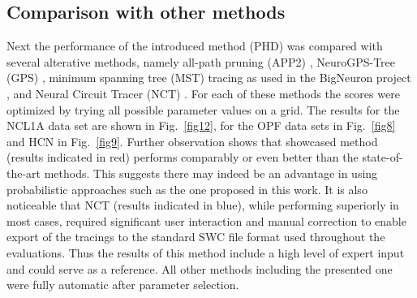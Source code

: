 \subsection{Comparison with other methods}
\label{subsec:comparison-with-other-methods}
Next the performance of the introduced method (PHD) was compared with several alterative methods, namely all-path pruning (APP2) \cite{xiao2013app2}, NeuroGPS-Tree (GPS) \cite{quan2016neurogps}, minimum spanning tree (MST) tracing as used in the BigNeuron project \cite{peng2015bigneuron}, and Neural Circuit Tracer (NCT) \cite{chothani2011automated}. For each of these methods the scores were optimized by trying all possible parameter values on a grid. The results for the NCL1A data set are shown in Fig.~\ref{fig12}, for the OPF data sets in Fig.~\ref{fig8} and HCN in Fig.~\ref{fig9}. Further observation shows that showcased method (results indicated in red) performs comparably or even better than the state-of-the-art methods. This suggests there may indeed be an advantage in using probabilistic approaches such as the one proposed in this work. It is also noticeable that NCT (results indicated in blue), while performing superiorly in most cases, required significant user interaction and manual correction to enable export of the tracings to the standard SWC file format used throughout the evaluations. Thus the results of this method include a high level of expert input and could serve as a reference. All other methods including the presented one were fully automatic after parameter selection.

